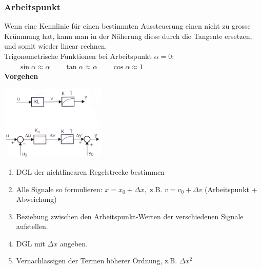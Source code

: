 		\subsubsection{Arbeitspunkt }
			Wenn eine Kennlinie für einen bestimmten Aussteuerung einen nicht zu grosse
			Krümmung hat, kann man in der Näherung diese durch die Tangente ersetzen, und
			somit wieder linear rechnen. \\
			Trigonometrische Funktionen bei Arbeitspunkt $\alpha = 0$: $\qquad \sin \alpha \approx
			\alpha \qquad \tan \alpha \approx \alpha \qquad \cos \alpha \approx 1$ \\
			\textbf{Vorgehen} \\
			\begin{minipage}[c]{5cm}
				\includegraphics[width=5cm]{bilder/LinArbeitspunkt}
			\end{minipage}
			\begin{minipage}[c]{16cm}
				\begin{enumerate}
					\item DGL der nichtlinearen Regelstrecke bestimmen
					\item Alle Signale so formulieren: $x = x_0 + \Delta x,$ z.B. $v=v_0 + \Delta v$ (Arbeitspunkt + Abweichung)
					\item Beziehung zwischen den Arbeitspunkt-Werten der verschiedenen Signale aufstellen.
					\item DGL mit $\Delta x$ angeben.
					\item Vernachlässigen der Termen höherer Ordnung, z.B. $\Delta x^2$
				\end{enumerate}
	
			\end{minipage}
			
